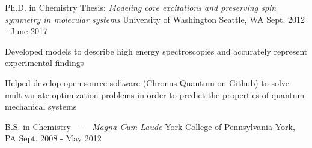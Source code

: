 


\begin{cventries}


\cventry
{Ph.D. in Chemistry \newline
Thesis: \textit{Modeling core excitations and preserving spin symmetry in molecular systems}} %
{University of Washington} %
{Seattle, WA\vspace{-0.5cm}} %
{Sept. 2012 - June 2017} %
{\begin{cvitems}
\item{Developed models to describe high energy spectroscopies and accurately represent experimental findings}
\item{Helped develop open-source software (Chronus Quantum on Github) to solve multivariate optimization problems in order to predict the properties of quantum mechanical systems}
\end{cvitems}
}



\cventry
{B.S. in Chemistry~~--~~\textit{Magna Cum Laude}} %
{York College of Pennsylvania} %
{York, PA} %
{Sept. 2008 - May 2012} %
{}


\end{cventries}
